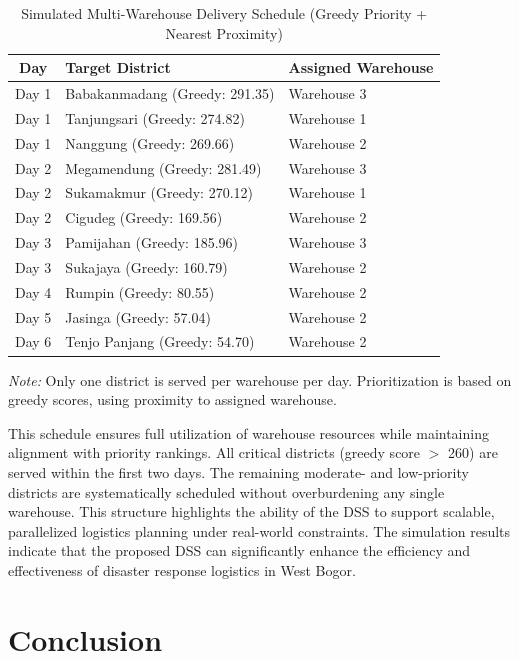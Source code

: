 \documentclass[conference,final,a4paper,twoside,10pt]{IEEEtran}
\begin{document}
\begin{table}[H]
\caption{Simulated Multi-Warehouse Delivery Schedule (Greedy Priority + Nearest Proximity)}
\begin{center}
\begin{tabular}{|c|p{4cm}|p{}|}
\hline
\textbf{Day} & \textbf{Target District} & \textbf{Assigned Warehouse} \\
\hline
Day 1 & Babakanmadang (Greedy: 291.35) & Warehouse 3 \\
\hline
Day 1 & Tanjungsari (Greedy: 274.82) & Warehouse 1 \\
\hline
Day 1 & Nanggung (Greedy: 269.66) & Warehouse 2 \\
\hline
Day 2 & Megamendung (Greedy: 281.49) & Warehouse 3 \\
\hline
Day 2 & Sukamakmur (Greedy: 270.12) & Warehouse 1 \\
\hline
Day 2 & Cigudeg (Greedy: 169.56) & Warehouse 2 \\
\hline
Day 3 & Pamijahan (Greedy: 185.96) & Warehouse 3 \\
\hline
Day 3 & Sukajaya (Greedy: 160.79) & Warehouse 2 \\
\hline
Day 4 & Rumpin (Greedy: 80.55) & Warehouse 2 \\
\hline
Day 5 & Jasinga (Greedy: 57.04) & Warehouse 2 \\
\hline
Day 6 & Tenjo Panjang (Greedy: 54.70) & Warehouse 2 \\
\hline
\end{tabular}
\label{tab:distribution_schedule}
\end{center}
\footnotesize{\textit{Note:} Only one district is served per warehouse per day. Prioritization is based on greedy scores, using proximity to assigned warehouse.}
\end{table}

This schedule ensures full utilization of warehouse resources while maintaining alignment with priority rankings. All critical districts (greedy score $>$ 260) are served within the first two days. The remaining moderate- and low-priority districts are systematically scheduled without overburdening any single warehouse. This structure highlights the ability of the DSS to support scalable, parallelized logistics planning under real-world constraints.
The simulation results indicate that the proposed DSS can significantly enhance the efficiency and effectiveness of disaster response logistics in West Bogor. 

\section{Conclusion}
\end{document}
